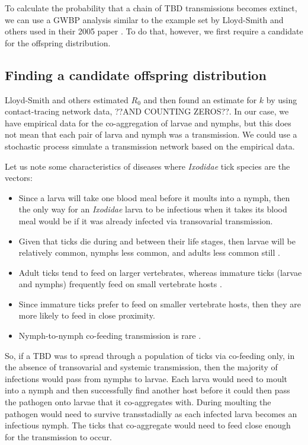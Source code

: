 \documentclass{article}
\begin{document}
To calculate the probability that a chain of TBD transmissions becomes extinct, we can use a GWBP analysis similar to the example set by Lloyd-Smith and others used in their 2005 paper \cite{LloydSmith2005}. To do that, however, we first require a candidate for the offspring distribution.

\subsection{Finding a candidate offspring distribution}

Lloyd-Smith and others estimated $ R_0 $ and then found an estimate for $ k $ by using contact-tracing network data, ??AND COUNTING ZEROS??. In our case, we have empirical data for the co-aggregation of larvae and nymphs, but this does not mean that each pair of larva and nymph was a transmission. We could use a stochastic process simulate a transmission network based on the empirical data. 

Let us note some characteristics of diseases where \textit{Ixodidae} tick species are the vectors:
\begin{itemize}
	\item Since a larva will take one blood meal before it moults into a nymph, then the only way for an \textit{Ixodidae} larva to be infectious when it takes its blood meal would be if it was already infected via transovarial transmission.
	\item Given that ticks die during and between their life stages, then larvae will be relatively common, nymphs less common, and adults less common still \cite{Randolph1998}.
	\item Adult ticks tend to feed on larger vertebrates, whereas immature ticks (larvae and nymphs) frequently feed on small vertebrate hosts \cite{Herrmann2015, Randolph1998}.
	\item Since immature ticks prefer to feed on smaller vertebrate hosts, then they are more likely to feed in close proximity.
	\item Nymph-to-nymph co-feeding transmission is rare \cite{VOORDOUW2014}.
\end{itemize}

So, if a TBD was to spread through a population of ticks via co-feeding only, in the absence of transovarial and systemic transmission, then the majority of infections would pass from nymphs to larvae. Each larva would need to moult into a nymph and then successfully find another host before it could then pass the pathogen onto larvae that it co-aggregates with. During moulting the pathogen would need to survive transstadially as each infected larva becomes an infectious nymph. The ticks that co-aggregate would need to feed close enough for the transmission to occur.
\end{document}
